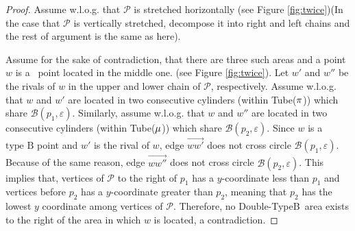 \documentclass[a4paper,UKenglish]{lipics}
\newcommand{\eps}{\varepsilon}
\newcommand{\REM}[1]{}
\newcommand{\CR}{{\mathscr R}}
\newcommand{\CB}{{\mathscr B}}
\newcommand{\Pol}{{\mathscr P}}
\newcommand{\R}{\CR}
\newcommand{\DoubleB}{Double-TypeB}
\newcommand{\Dir}{\overrightarrow}
\newcommand{\pset}{S}
\newcommand{\SemiBad}{\mbox{type B}}
\newcommand{\lme}[1]{{\lambda_{#1}}}
\begin{document}
\begin{proof}

Assume w.l.o.g. that $\Pol$ is stretched horizontally (see Figure \ref{fig:twice})(In the case that $\Pol$ is vertically stretched, decompose 
it into right and left chains and the rest of 
argument is the same as here).  


Assume for the sake of contradiction,
that there are three such areas and 
a point $w$ is a \TwiceB ~point located in the middle one.
(see Figure \ref{fig:twice}). 
Let $w'$ and $w''$ be the rivals of $w$ in the upper 
and lower chain of $\Pol$, respectively. 
Assume w.l.o.g. that $w$ and $w'$
are located in two consecutive cylinders (within Tube($\pi$)) which 
share $\CB(p_1,\eps)$. 
Similarly, assume w.l.o.g. that $w$ and $w''$
are located in two consecutive cylinders (within Tube($\mu$)) which 
share $\CB(p_2,\eps)$.
Since $w$ is a $\SemiBad$ point and $w'$ is the rival of $w$, 
edge $\Dir{ww'}$ does not cross circle $\CB(p_1,\eps)$. 
Because of the same reason, edge $\Dir{ww''}$ does not cross circle $\CB(p_2,\eps)$. 
This implies that, vertices of $\Pol$ to the right of $p_1$ has 
a $y$-coordinate less than $p_1$ and vertices before $p_2$  
has a $y$-coordinate greater than $p_2$, meaning that $p_2$
has the lowest $y$ coordinate among vertices of $\Pol$.
Therefore, no \DoubleB~area exists to the right of the 
area in which $w$ is located, a contradiction.






\REM{
To prove the lemma, we first investigate a situation where 
a point is in more than one reachability sets and then from there, we establish
the lemma.


If $u \in \pset$ is in $\R_{i}$ and $\R_{i+1}$, 
then it is $\Good$ point at $C_i$.
Let $p$ be a vertex of the polygon and $\CB(p,\eps)$ be 
the circle shared between $C_i$ and $C_{i+1}$. 

 

One of these two cases may happen here: (i) point $u$ lies in
$\CB(p,\eps)$ (see Figure \ref{fig:twice}a), 
then obviously $u$ is a $\Good$ point at $C_i$
(ii)  point $u$ doesn't lie in
$\CB(p,\eps)$ (see Figure \ref{fig:twice}b), we show 
that although $\Dir{u\lambda_{i+1}}$ could not 
cross $\CB(p,\eps)$, 
but still $u$ is a $\Good$ point at $C_i$:

Assume for the sake of contradiction, that 
$u$ is $\SemiBad$ point at $C_i$.
Thus, by the definition of $\SemiBad$ points, 
no semi-feasible 
curve exists which contains $u$ as its vertex
and ends at $\lme{i+1}$.
Therefore, since $u \in \R_{i+1}$, 
it must be located entirely after 
$\lme{i+1}$ in $C_{j+1}$
(for example, in Figure \ref{fig:twice}b, $u$ 
can be located at the place where $u'$ is). This contradicts 
the fact that $u$ is in $S_i$(or located within $C_i$).
}
\end{proof}
\end{document}
